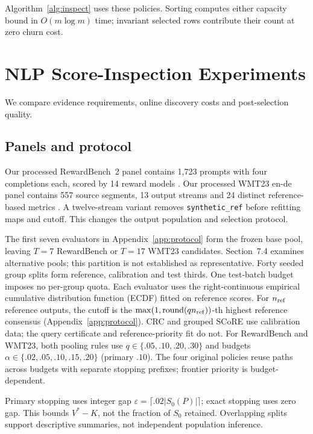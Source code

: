 \documentclass[11pt]{article}
\begin{document}
Algorithm~\ref{alg:inspect} uses these policies. Sorting computes either capacity bound in $O(m\log m)$ time; invariant selected rows contribute their count at zero churn cost.

\section{NLP Score-Inspection Experiments}
\label{sec:experiments}

We compare evidence requirements, online discovery costs and post-selection quality.

\subsection{Panels and protocol}
Our processed RewardBench~2 panel contains 1,723 prompts with four completions each, scored by 14 reward models \citep{malik2026rewardbench2}. Our processed WMT23 en-de panel contains 557 source segments, 13 output streams and 24 distinct reference-based metrics \citep{freitag2023wmt23}. A twelve-stream variant removes \texttt{synthetic\_ref} before refitting maps and cutoff. This changes the output population and selection protocol.

The first seven evaluators in Appendix~\ref{app:protocol} form the frozen base pool, leaving $T=7$ RewardBench or $T=17$ WMT23 candidates. Section~7.4 examines alternative pools; this partition is not established as representative. Forty seeded group splits form reference, calibration and test thirds. One test-batch budget imposes no per-group quota. Each evaluator uses the right-continuous empirical cumulative distribution function (ECDF) fitted on reference scores. For $n_{\rm ref}$ reference outputs, the cutoff is the $\max(1,\operatorname{round}(qn_{\rm ref}))$-th highest reference consensus (Appendix~\ref{app:protocol}). CRC and grouped SCoRE use calibration data; the query certificate and reference-priority fit do not. For RewardBench and WMT23, both pooling rules use $q\in\{.05,.10,.20,.30\}$ and budgets $\alpha\in\{.02,.05,.10,.15,.20\}$ (primary $.10$). The four original policies reuse paths across budgets with separate stopping prefixes; frontier priority is budget-dependent.

Primary stopping uses integer gap $\varepsilon=\lceil.02|S_0(P)|\rceil$; exact stopping uses zero gap. This bounds $V^*-K$, not the fraction of $S_0$ retained. Overlapping splits support descriptive summaries, not independent population inference.
\end{document}
